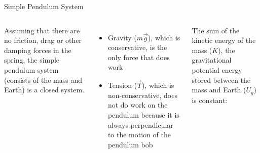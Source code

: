 \documentclass[12pt,compress,aspectratio=169]{beamer}
\begin{document}
\begin{frame}{Simple Pendulum System}
  \begin{columns}
    Assuming that there are no friction, drag or other damping forces in the
    spring, the simple pendulum system (consists of the mass and Earth) is a
    closed system.
    \begin{itemize}
    \item Gravity ($m\vec g$), which is conservative, is the only force that
      does work
    \item Tension ($\vec T$), which is non-conservative, does not do work on the
      pendulum because it is always perpendicular to the motion of the pendulum
      bob
    \end{itemize}
    The sum of the kinetic energy of the mass ($K$), the gravitational
    potential energy stored between the mass and Earth ($U_g$) is constant:

    
    \centering
  \end{columns}
\end{frame}
\end{document}
